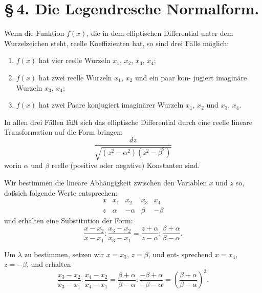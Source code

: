 \documentclass[12pt,a4paper]{book}
\theoremstyle{definition}
\begin{document}
\section*{\S\,4. Die Legendresche Normalform.}

Wenn die Funktion $f(x)$, die in dem elliptischen Differential
unter dem Wurzelzeichen steht, reelle Koeffizienten hat, so sind
drei F\"alle m\"oglich:

\begin{enumerate}[label=\arabic*.]
\item $f(x)$ hat vier reelle Wurzeln $x_1$, $x_2$, $x_3$, $x_4$;
\item $f(x)$ hat zwei reelle Wurzeln $x_1$, $x_2$ und ein paar kon-
jugiert imagin\"are Wurzeln $x_3$, $x_4$;
\item $f(x)$ hat zwei Paare konjugiert imagin\"arer Wurzeln $x_1$, $x_2$
und $x_3$, $x_4$.
\end{enumerate}

In allen drei F\"allen l\"a\ss t sich das elliptische Differential durch
eine reelle lineare Transformation auf die Form bringen:
\begin{equation}
\frac{dz}{\sqrt{(z^2 - \alpha^2)(z^2 - \beta^2)}} \tag{1}
\end{equation}
worin $\alpha$ und $\beta$ reelle (positive oder negative) Konstanten sind.

Wir bestimmen die lineare Abh\"angigkeit zwischen den
Variablen $x$ und $z$ so, da\ss sich folgende Werte entsprechen:
\begin{equation}
\begin{array}{c|cccc}
x & x_1 & x_2 & x_3 & x_4 \\ \hline
z & \alpha & -\alpha & \beta & -\beta
\end{array}
\tag{2}
\end{equation}
und erhalten eine Substitution der Form:
\begin{equation}
\frac{x - x_2}{x - x_1} : \frac{x_3 - x_2}{x_3 - x_1} = \frac{z + \alpha}{z - \alpha} : \frac{\beta + \alpha}{\beta - \alpha}. \tag{3}
\end{equation}

Um $\lambda$ zu bestimmen, setzen wir $x = x_3$, $z = \beta$, und ent-
sprechend $x = x_4$, $z = -\beta$, und erhalten
\begin{equation}
\frac{x_3 - x_2}{x_3 - x_1} : \frac{x_4 - x_2}{x_4 - x_1} = \frac{\beta + \alpha}{\beta - \alpha} : \frac{-\beta + \alpha}{-\beta - \alpha} = \left(\frac{\beta + \alpha}{\beta - \alpha}\right)^2. \tag{4}
\end{equation}
\end{document}
